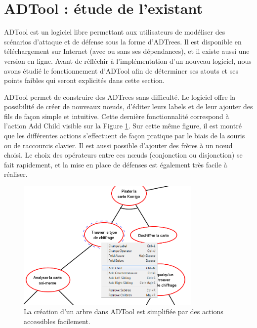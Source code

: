 \section{ADTool : étude de l'existant}
	\label{sec:adtool}

	ADTool est un logiciel libre permettant aux utilisateurs de modéliser des scénarios d'attaque et de défense sous la forme d'ADTrees. Il est disponible en téléchargement sur Internet (avec ou sans ses dépendances), et il existe aussi une version en ligne. Avant de réfléchir à l'implémentation d'un nouveau logiciel, nous avons étudié le fonctionnement d'ADTool afin de déterminer ses atouts et ses points faibles qui seront explicités dans cette section.

	ADTool permet de construire des ADTrees sans difficulté. Le logiciel offre la possibilité de créer de nouveaux nœuds, d'éditer leurs labels et de leur ajouter des fils de façon simple et intuitive. Cette dernière fonctionnalité correspond à l'action \og Add Child \fg{} visible sur la {\sc Figure} \ref{fig:arbre_exemple_1}. Sur cette même figure, il est montré que les différentes actions s'effectuent de façon pratique par le biais de la souris ou de raccourcis clavier. Il est aussi possible d'ajouter des frères à un nœud choisi. Le choix des opérateurs entre ces nœuds (conjonction ou disjonction)  se fait rapidement, et la mise en place de défenses est également très facile à réaliser. 
	
	\begin{figure}[h]
        \centering
        \includegraphics[width=0.8\textwidth]{figure/adtool_add_child.png}
        \caption{La création d'un arbre dans ADTool est simplifiée par des actions accessibles facilement.}
        \label{fig:arbre_exemple_1}
    \end{figure}
	
